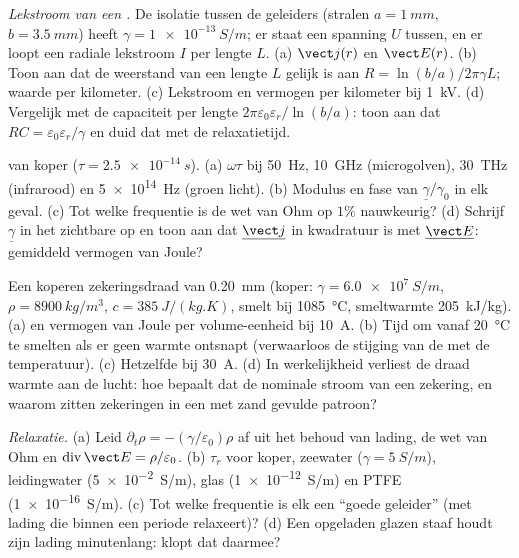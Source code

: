 \begin{exercise}[$\star\star$]\label{exo:b2:charges-currents-conduction:6}
\emph{Lekstroom van een .} De isolatie tussen de geleiders (stralen
$a = \qty{1}{mm}$, $b = \qty{3.5}{mm}$) heeft $\gamma = \qty{1e-13}{S/m}$;
er staat een spanning $U$ tussen, en er loopt een radiale lekstroom $I$ per
lengte $L$. (a) $\vect j(r)$ en $\vect E(r)$. (b) Toon aan dat de weerstand
van een lengte $L$ gelijk is aan $R = \ln(b/a)/2\pi\gamma L$; waarde per
kilometer. (c) Lekstroom en vermogen per kilometer bij \qty{1}{kV}. (d)
Vergelijk met de capaciteit per lengte
$2\pi\varepsilon_0\varepsilon_r/\ln(b/a)$: toon aan dat
$RC = \varepsilon_0\varepsilon_r/\gamma$ en duid dat met de relaxatietijd.
\end{exercise}

\begin{exercise}[$\star\star$]\label{exo:b2:charges-currents-conduction:7}
 van koper ($\tau = \qty{2.5e-14}{s}$). (a)
$\omega\tau$ bij \qty{50}{Hz}, \qty{10}{GHz} (microgolven), \qty{30}{THz}
(infrarood) en \qty{5e14}{Hz} (groen licht). (b) Modulus en fase van
$\underline\gamma/\gamma_0$ in elk geval. (c) Tot welke frequentie is de wet
van Ohm op $1\%$ nauwkeurig? (d) Schrijf $\underline\gamma$ in het zichtbare
op en toon aan dat $\underline{\vect j}$ in kwadratuur is met
$\underline{\vect E}$: gemiddeld vermogen van Joule?
\end{exercise}

\begin{exercise}[$\star\star$]\label{exo:b2:charges-currents-conduction:8}
Een koperen zekeringsdraad van \qty{0.20}{mm} (koper:
$\gamma = \qty{6.0e7}{S/m}$, $\rho =
\qty{8900}{kg/m^3}$,
$c = \qty{385}{J/(kg.K)}$, smelt bij \qty{1085}{\degreeCelsius}, smeltwarmte
\qty{205}{kJ/kg}). (a)  en vermogen van Joule per
volume-eenheid bij \qty{10}{A}. (b) Tijd om vanaf \qty{20}{\degreeCelsius}
te smelten als er geen warmte ontsnapt (verwaarloos de stijging van de
 met de temperatuur). (c) Hetzelfde bij \qty{30}{A}.
(d) In werkelijkheid verliest de draad warmte aan de lucht: hoe bepaalt dat
de nominale stroom van een zekering, en waarom zitten zekeringen in een met
zand gevulde patroon?
\end{exercise}

\begin{exercise}[$\star\star$]\label{exo:b2:charges-currents-conduction:9}
\emph{Relaxatie.} (a) Leid $\partial_t\rho = -(\gamma/\varepsilon_0)\rho$ af
uit het behoud van lading, de wet van Ohm en
$\operatorname{div}\vect E = \rho/\varepsilon_0$. (b) $\tau_r$ voor koper,
zeewater ($\gamma = \qty{5}{S/m}$), leidingwater (\qty{5e-2}{S/m}), glas
(\qty{1e-12}{S/m}) en PTFE (\qty{1e-16}{S/m}). (c) Tot welke frequentie is
elk een ``goede geleider'' (met lading die binnen een periode relaxeert)?
(d) Een opgeladen glazen staaf houdt zijn lading minutenlang: klopt dat
daarmee?
\end{exercise}

